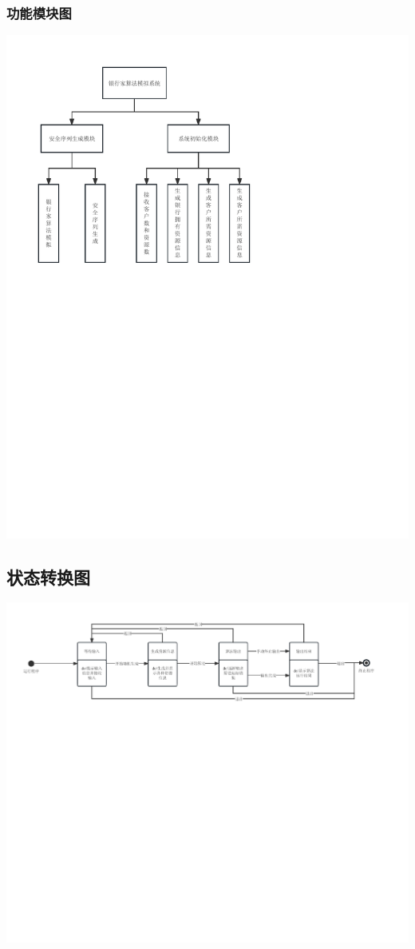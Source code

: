 \documentclass{article}
\begin{document}
			\subsubsection{功能模块图}
				{\centering
					\includegraphics[align=c,width=\textwidth,height=\textheight/2]{模块功能图.pdf}
				}	
		\subsection{状态转换图}
			{\centering
				\includegraphics[align=c,width=\textwidth]{状态图.pdf}
			}\label{subsec:}
\end{document}
